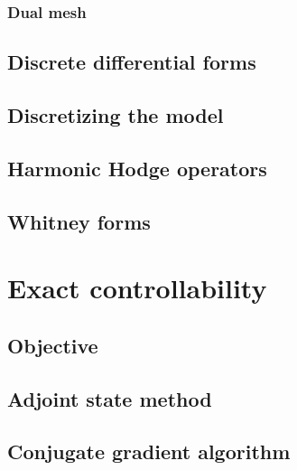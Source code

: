 \documentclass[utf8,english]{gradu3}
\begin{document}
\subsection{Dual mesh}\label{dual_mesh}

\section{Discrete differential forms}


\parencite{desbrun_discrete_2006}

\section{Discretizing the model}


\section{Harmonic Hodge operators}

\section{Whitney forms}



\chapter{Exact controllability}


\section{Objective}

\section{Adjoint state method}

\section{Conjugate gradient algorithm}
\end{document}
